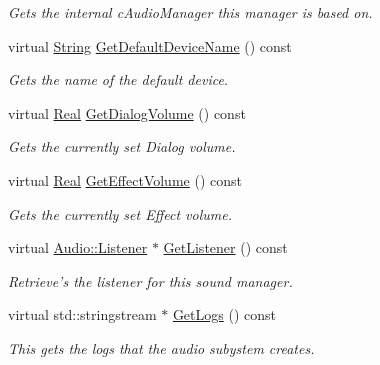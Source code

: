 \begin{DoxyCompactItemize}
\begin{DoxyCompactList}\small\item\em Gets the internal cAudioManager this manager is based on. \item\end{DoxyCompactList}\item 
virtual \hyperlink{namespaceMezzanine_acf9fcc130e6ebf08e3d8491aebcf1c86}{String} \hyperlink{classMezzanine_1_1AudioManager_aaf0f4e44c56f9dc82005c12e766ca5ef}{GetDefaultDeviceName} () const 
\begin{DoxyCompactList}\small\item\em Gets the name of the default device. \item\end{DoxyCompactList}\item 
virtual \hyperlink{namespaceMezzanine_a726731b1a7df72bf3583e4a97282c6f6}{Real} \hyperlink{classMezzanine_1_1AudioManager_a8eb5c6da62ca7bafb1e990746a0f9397}{GetDialogVolume} () const 
\begin{DoxyCompactList}\small\item\em Gets the currently set Dialog volume. \item\end{DoxyCompactList}\item 
virtual \hyperlink{namespaceMezzanine_a726731b1a7df72bf3583e4a97282c6f6}{Real} \hyperlink{classMezzanine_1_1AudioManager_a06657b2cecce3b0953dc74bcafcff672}{GetEffectVolume} () const 
\begin{DoxyCompactList}\small\item\em Gets the currently set Effect volume. \item\end{DoxyCompactList}\item 
virtual \hyperlink{classMezzanine_1_1Audio_1_1Listener}{Audio::Listener} $\ast$ \hyperlink{classMezzanine_1_1AudioManager_ae24f6ec9247699ed1fae96846c4dfcae}{GetListener} () const 
\begin{DoxyCompactList}\small\item\em Retrieve's the listener for this sound manager. \item\end{DoxyCompactList}\item 
virtual std::stringstream $\ast$ \hyperlink{classMezzanine_1_1AudioManager_a28287efea5943984f96a9ddfd1a2e2a9}{GetLogs} () const 
\begin{DoxyCompactList}\small\item\em This gets the logs that the audio subystem creates. \item\end{DoxyCompactList}\item 

\end{DoxyCompactItemize}
